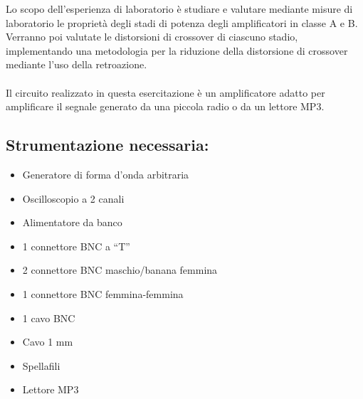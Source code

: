 Lo scopo dell'esperienza di laboratorio è studiare e valutare mediante misure di laboratorio le proprietà degli stadi di potenza degli amplificatori in classe A e B. Verranno poi valutate le distorsioni di crossover di ciascuno stadio, implementando una metodologia per la riduzione della distorsione di crossover mediante l'uso della retroazione.\\\\
Il circuito realizzato in questa esercitazione è un amplificatore adatto per amplificare il segnale generato da una piccola radio o da un lettore MP3.
\subsection*{Strumentazione necessaria:}
\begin{itemize}
    \item Generatore di forma d'onda arbitraria
    \item Oscilloscopio a 2 canali
    \item Alimentatore da banco
    \item 1 connettore BNC a “T”
	\item 2 connettore BNC maschio/banana femmina
	\item 1 connettore BNC femmina-femmina
	\item 1 cavo BNC
	\item Cavo 1 mm
	\item Spellafili
    \item Lettore MP3
\end{itemize}